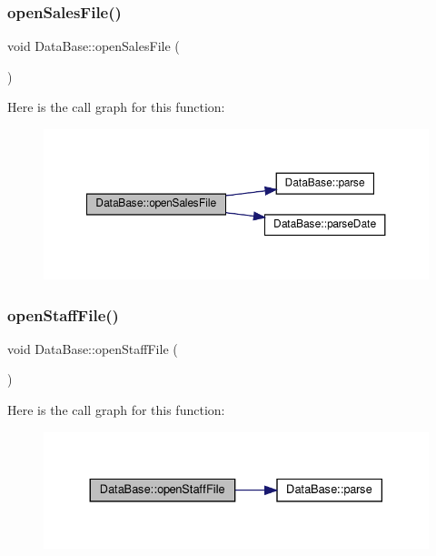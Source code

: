 \subsubsection{\texorpdfstring{open\+Sales\+File()}{openSalesFile()}}
{\footnotesize\ttfamily void Data\+Base\+::open\+Sales\+File (\begin{DoxyParamCaption}{ }\end{DoxyParamCaption})}

Here is the call graph for this function\+:\nopagebreak
\begin{figure}[H]
\begin{center}
\leavevmode
\includegraphics[width=350pt]{classDataBase_a5b7842d4ca431e2edb592fadc16da4c6_cgraph}
\end{center}
\end{figure}
\mbox{\label{classDataBase_a22f0ad79cc0d695ac5c4cfb3c556f920}} 
\subsubsection{\texorpdfstring{open\+Staff\+File()}{openStaffFile()}}
{\footnotesize\ttfamily void Data\+Base\+::open\+Staff\+File (\begin{DoxyParamCaption}{ }\end{DoxyParamCaption})}

Here is the call graph for this function\+:\nopagebreak
\begin{figure}[H]
\begin{center}
\leavevmode
\includegraphics[width=330pt]{classDataBase_a22f0ad79cc0d695ac5c4cfb3c556f920_cgraph}
\end{center}
\end{figure}
\mbox{\label{classDataBase_aa7cfe42e76e1d57c0adfb82d0c82f96e}} 
